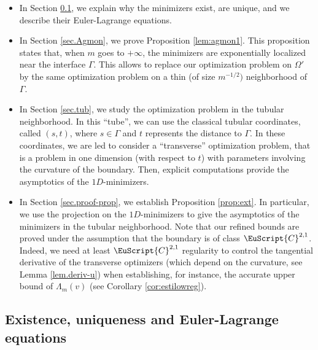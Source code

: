 \documentclass[JEP,XML,SOM,Unicode]{cedram}
\let\mathcal \EuScript
\newcommand{\cC}{\mathcal{C}}
\theoremstyle{plain}
\theoremstyle{definition}
\begin{document}
\begin{itemize}
\item In Section \ref{sec.exist-unique}, we explain why the minimizers exist, are unique, and we describe their Euler-Lagrange equations.
\item In Section \ref{sec.Agmon}, we prove Proposition \ref{lem:agmon1}. This proposition states that, when $m$ goes to $+\infty$, the minimizers are exponentially localized near the interface $\Gamma$. This allows to replace our optimization problem on $\Omega'$ by the same optimization problem on a thin (of size $m^{-1/2})$ neighborhood of $\Gamma$.
\item In Section \ref{sec.tub}, we study the optimization problem in the tubular neighborhood. In this \enquote{tube}, we can use the classical tubular coordinates, called $(s,t)$, where $s\in\Gamma$ and $t$ represents the distance to $\Gamma$. In these coordinates, we are led to consider a \enquote{transverse} optimization problem, that is a problem in one dimension (with respect to $t$) with parameters involving the curvature of the boundary. Then, explicit computations provide the asymptotics of the $1D$-minimizers.
\item In Section \ref{sec.proof-prop}, we establish Proposition \ref{prop:ext}. In particular, we use the projection on the $1D$-minimizers to give the asymptotics of the minimizers in the tubular neighborhood. Note that our refined bounds are proved under the assumption that the boundary is of class $\cC^{2,1}$. Indeed, we need at least $\cC^{2,1}$ regularity to control the tangential derivative of the transverse optimizers (which depend on the curvature, see Lemma \ref{lem.deriv-u}) when establishing, for instance, the accurate upper bound of $\Lambda_m(v)$ (see Corollary \ref{cor:estilowreg}).
\end{itemize}

\subsection{Existence, uniqueness and Euler-Lagrange equations}\label{sec.exist-unique}
\end{document}
